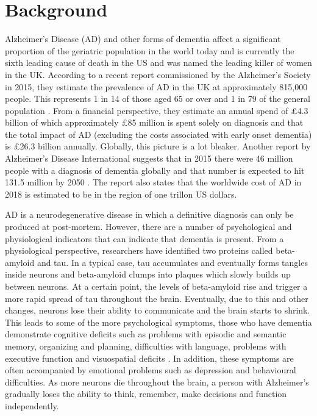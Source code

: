 \documentclass[10pt, letterpaper, twoside, openany]{thesis}
\begin{document}
\section{Background}
Alzheimer's Disease (AD) and other forms of dementia affect a significant proportion of the geriatric population in the world today and is currently the sixth leading cause of death in the US and was named the leading killer of women in the UK. According to a recent report commissioned by the Alzheimer's Society in 2015, they estimate the prevalence of AD in the UK at approximately 815,000 people. This represents 1 in 14 of those aged 65 or over and 1 in 79 of the general population \cite{AlzheimersSociety2014}. From a financial perspective, they estimate an annual spend of £4.3 billion of which approximately £85 million is spent solely on diagnosis and that the total impact of AD (excluding the costs associated with early onset dementia) is £26.3 billion annually. Globally, this picture is a lot bleaker. Another report by Alzheimer's Disease International suggests that in 2015 there were 46 million people with a diagnosis of dementia globally and that number is expected to hit 131.5 million by 2050 \cite{Prince2015}. The report also states that the worldwide cost of AD in 2018 is estimated to be in the region of one trillon US dollars.
\par 
AD is a neurodegenerative disease in which a definitive diagnosis can only be produced at post-mortem. However, there are a number of psychological and physiological indicators that can indicate that dementia is present. From a physiological perspective, researchers have identified two proteins called beta-amyloid and tau. In a typical case, tau accumulates and eventually forms tangles inside neurons and beta-amyloid clumps into plaques which slowly builds up between neurons. At a certain point, the levels of beta-amyloid rise and trigger a more rapid spread of tau throughout the brain. Eventually, due to this and other changes, neurons lose their ability to communicate and the brain starts to shrink. This leads to some of the more psychological symptoms, those who have dementia demonstrate cognitive deficits such as problems with episodic and semantic memory, organizing and planning, difficulties with language, problems with executive function and visuospatial deficits \cite{McKhann2011}. In addition, these symptoms are often accompanied by emotional problems such as depression and behavioural difficulties. As more neurons die throughout the brain, a person with Alzheimer's gradually loses the ability to think, remember, make decisions and function independently.
\end{document}
